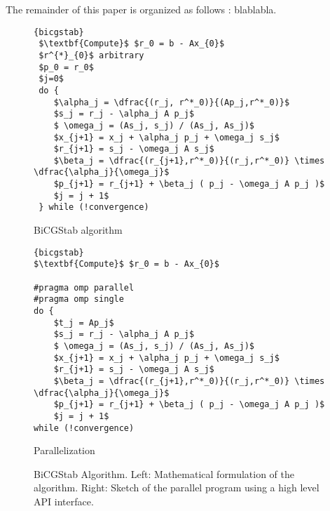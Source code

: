 \documentclass{Styles/llncs}
\begin{document}

The remainder of this paper is organized as follows : blablabla.

\begin{figure}[t]
\begin{minipage}[c]{0.4\linewidth}
\begin{lstlisting}[frame=none,style=smaller,showlines=true,mathescape=true]{bicgstab}
 $\textbf{Compute}$ $r_0 = b - Ax_{0}$
 $r^{*}_{0}$ arbitrary
 $p_0 = r_0$
 $j=0$
 do {
	$\alpha_j = \dfrac{(r_j, r^*_0)}{(Ap_j,r^*_0)}$
	$s_j = r_j - \alpha_j A p_j$
	$ \omega_j = (As_j, s_j) / (As_j, As_j)$
	$x_{j+1} = x_j + \alpha_j p_j + \omega_j s_j$
	$r_{j+1} = s_j - \omega_j A s_j$
	$\beta_j = \dfrac{(r_{j+1},r^*_0)}{(r_j,r^*_0)} \times \dfrac{\alpha_j}{\omega_j}$
	$p_{j+1} = r_{j+1} + \beta_j ( p_j - \omega_j A p_j )$
	$j = j + 1$
 } while (!convergence)
\end{lstlisting}
\centerline{BiCGStab algorithm}
\end{minipage}\hfill
\begin{minipage}[c]{0.5\linewidth}
\begin{lstlisting}[frame=none,style=smaller,showlines=true,mathescape=true,firstnumber=1]{bicgstab}
$\textbf{Compute}$ $r_0 = b - Ax_{0}$

#pragma omp parallel
#pragma omp single
do {
	$t_j = Ap_j$
	$s_j = r_j - \alpha_j A p_j$
	$ \omega_j = (As_j, s_j) / (As_j, As_j)$
	$x_{j+1} = x_j + \alpha_j p_j + \omega_j s_j$
	$r_{j+1} = s_j - \omega_j A s_j$
	$\beta_j = \dfrac{(r_{j+1},r^*_0)}{(r_j,r^*_0)} \times \dfrac{\alpha_j}{\omega_j}$
	$p_{j+1} = r_{j+1} + \beta_j ( p_j - \omega_j A p_j )$
	$j = j + 1$
while (!convergence)
\end{lstlisting}
\centerline{Parallelization}
\end{minipage}
\caption{BiCGStab Algorithm. Left: Mathematical formulation of the algorithm. Right: Sketch of the parallel program using a high level API interface.} \label{lst:bicgstab}
\end{figure}
\end{document}

